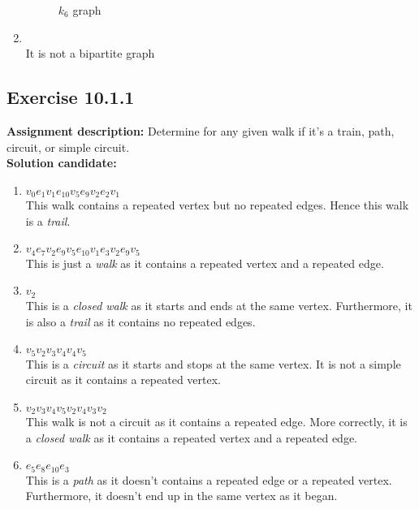 \documentclass{report}
\newcommand{\assignmentDescription}{\textbf{Assignment description: }}
\newcommand{\solution}{\textbf{Solution candidate: }}
\newcommand{\Exercise}[1]{\subsection{Exercise #1}}
\newcommand{\defaultEnumerateLabel}{\textbf{\alph*.}}
\newcommand{\emptyItem}{\item \,\\}
\newcommand{\myItem}[1]{\item #1\\}
\begin{document}
\begin{enumerate}[label=\defaultEnumerateLabel]
\begin{figure}[H]
			\caption{$k_6$ graph}
		\end{figure}
		
		\emptyItem
		
		It is not a bipartite graph
	\end{enumerate}
	
	\Exercise{10.1.1}
	
	\assignmentDescription
	Determine for any given walk if it's a train, path, circuit, or simple circuit.\\
	
	\solution
	
	\begin{enumerate}[label=\defaultEnumerateLabel]
		\item $v_0 e_1 v_1e_{10} v_5 e_9 v_2 e_2 v_1$\\
		
		This walk contains a repeated vertex but no repeated edges. Hence this walk is a \textit{trail}.
		
		\myItem{$v_4 e_7 v_2 e_9 v_5 e_{10} v_1 e_3 v_2 e_9 v_5$}
		
		This is just a \textit{walk} as it contains a repeated vertex and a repeated edge. 
		
		\myItem{$v_2$}
		
		This is a \textit{closed walk} as it starts and ends at the same vertex. Furthermore, it is also a \textit{trail} as it contains no repeated edges.
		
		\myItem{$v_5 v_2 v_3 v_4 v_4 v_5$}
		
		This is a \textit{circuit} as it starts and stops at the same vertex. It is not a simple circuit as it contains a repeated vertex.
		
		\myItem{$v_2 v_3 v_4 v_5 v_2 v_4 v_3 v_2$}
		
		This walk is not a circuit as it contains a repeated edge. More correctly, it is a \textit{closed walk} as it contains a repeated vertex and a repeated edge.
		
		\myItem{$e_5 e_8 e_{10} e_3$}
		
		This is a \textit{path} as it doesn't contains a repeated edge or a repeated vertex. Furthermore, it doesn't end up in the same vertex as it began.
		
		
	\end{enumerate}
	
\end{document}
